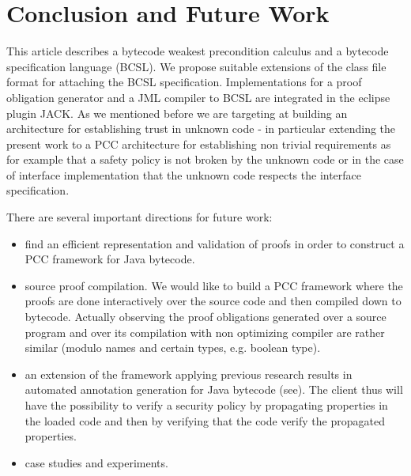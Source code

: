 \section{Conclusion and Future Work}\label{conclusion}
This article describes a bytecode weakest precondition calculus and a bytecode specification language (BCSL). We propose suitable extensions of the class file format for
attaching the BCSL specification. Implementations for a proof obligation generator and a JML compiler to BCSL are integrated in the eclipse plugin JACK. As we mentioned before we are targeting at building an architecture for establishing trust in unknown code - in particular extending the present work to a PCC architecture for establishing non trivial requirements as for example that a 
safety policy is not broken by the unknown code or in the case of interface implementation that the unknown code respects the interface specification.  


There are several important directions for future work:
\begin{itemize}
\item find an efficient representation and validation of proofs in order to construct a PCC framework for Java bytecode. 
\item source proof compilation. We would like to build a PCC framework where the proofs are done interactively over the source code
and then compiled down to bytecode. Actually observing the proof obligations generated over a source program and over its compilation with non optimizing compiler are
rather similar (modulo names and certain types, e.g. boolean type).
\item an extension of the framework applying previous research results in automated annotation generation for Java bytecode (see\cite{PBBHL}). The client thus will have the possibility to verify a security policy by propagating properties in the loaded code and then by verifying that the code verify the propagated properties.

\item case studies and experiments.
\end{itemize}

